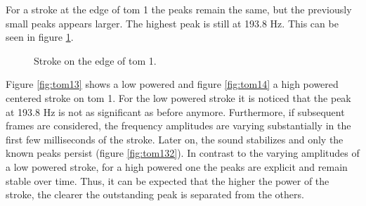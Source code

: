 For a stroke at the edge of tom 1 the peaks remain the same, but the previously small peaks appears larger. The highest peak is still at 193.8 Hz. This can be seen in figure \ref{fig:tom12}.

\begin{figure}
	\centering
	\caption{Stroke on the edge of tom 1.}
	\label{fig:tom12}
\end{figure}

Figure \ref{fig:tom13} shows a low powered and figure \ref{fig:tom14} a high powered centered stroke on tom 1. For the low powered stroke it is noticed that the peak at 193.8 Hz is not as significant as before anymore. Furthermore, if subsequent frames are considered, the frequency amplitudes are varying substantially in the first few milliseconds of the stroke. Later on, the sound stabilizes and only the known peaks persist (figure \ref{fig:tom132}). In contrast to the varying amplitudes of a low powered stroke, for a high powered one the peaks are explicit and remain stable over time. Thus, it can be expected that the higher the power of the stroke, the clearer the outstanding peak is separated from the others.

